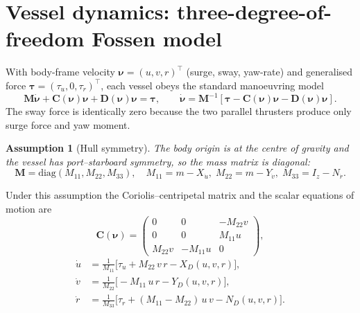 \documentclass[11pt]{article}
\newtheorem{assumption}{Assumption}
\newcommand{\nuv}{\boldsymbol{\nu}}
\begin{document}
\section{Vessel dynamics: three-degree-of-freedom Fossen model}
With body-frame velocity $\nuv=(u,v,r)^{\top}$ (surge, sway, yaw-rate) and
generalised force $\boldsymbol{\tau}=(\tau_u,0,\tau_r)^{\top}$, each vessel obeys
the standard manoeuvring model
\begin{equation}
\mathbf{M}\dot{\nuv} + \mathbf{C}(\nuv)\nuv + \mathbf{D}(\nuv)\nuv
= \boldsymbol{\tau},
\qquad
\dot{\nuv}=\mathbf{M}^{-1}\!\left[\boldsymbol{\tau}
-\mathbf{C}(\nuv)\nuv-\mathbf{D}(\nuv)\nuv\right].
\label{eq:fossen}
\end{equation}
The sway force is identically zero because the two parallel thrusters produce only
surge force and yaw moment.

\begin{assumption}[Hull symmetry]
The body origin is at the centre of gravity and the vessel has port--starboard
symmetry, so the mass matrix is diagonal:
\begin{equation}
\mathbf{M}=\mathrm{diag}(M_{11},M_{22},M_{33}),\quad
M_{11}=m-X_{\dot u},\;
M_{22}=m-Y_{\dot v},\;
M_{33}=I_z-N_{\dot r}.
\end{equation}
\end{assumption}

\noindent
Under this assumption the Coriolis--centripetal matrix and the scalar equations of
motion are
\begin{equation}
\mathbf{C}(\nuv)=
\begin{pmatrix}
0 & 0 & -M_{22}v\\
0 & 0 & M_{11}u\\
M_{22}v & -M_{11}u & 0
\end{pmatrix},
\end{equation}
\begin{align}
\dot u &= \tfrac{1}{M_{11}}\big[\tau_u + M_{22}\,v\,r - X_D(u,v,r)\big],\label{eq:udot}\\
\dot v &= \tfrac{1}{M_{22}}\big[-M_{11}\,u\,r - Y_D(u,v,r)\big],\label{eq:vdot}\\
\dot r &= \tfrac{1}{M_{33}}\big[\tau_r + (M_{11}-M_{22})\,u\,v - N_D(u,v,r)\big].\label{eq:rdot}
\end{align}
\end{document}
